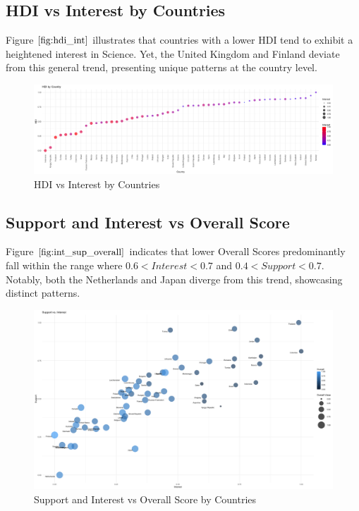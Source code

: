 \documentclass[12pt]{article}
\begin{document}
\subsection{HDI vs Interest by Countries}

Figure $\ref{fig:hdi_int}$ illustrates that countries with a lower HDI tend to exhibit a heightened interest in Science. Yet, the United Kingdom and Finland deviate from this general trend, presenting unique patterns at the country level.

\begin{figure}[htb]
\centering
\includegraphics[width=\linewidth]{images/hdi_interest_by_country}
\caption{HDI vs Interest by Countries}
\label{fig:hdi_int}
\end{figure}

\subsection{Support and Interest vs Overall Score}

Figure $\ref{fig:int_sup_overall}$ indicates that lower Overall Scores predominantly fall within the range where 
$0.6 < Interest < 0.7$ and 
$0.4 < Support < 0.7$. 
Notably, both the Netherlands and Japan diverge from this trend, showcasing distinct patterns.

\begin{figure}[htb]
\centering
\includegraphics[width=\linewidth]{images/interest_support_vs_overall}
\caption{Support and Interest vs Overall Score by Countries}
\label{fig:int_sup_overall}
\end{figure}
\end{document}

